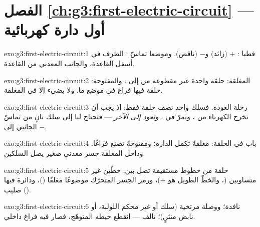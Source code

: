 \section*{الفصل \ref{ch:g3:first-electric-circuit} --- أول دارة كهربائية}

\begin{solution}{exo:g3:first-electric-circuit:1}
قطبا : $+$ (زائد) و$-$ (ناقص). وموضعا تماسّ :
الطرف في أسفل القاعدة، والجانب المعدني من القاعدة.
\end{solution}

\begin{solution}{exo:g3:first-electric-circuit:2}
المغلقة: حلقة واحدة غير مقطوعة من  إلى . والمفتوحة: حلقة
فيها فراغ في موضع ما. ولا يضيء  إلا في المغلقة.
\end{solution}

\begin{solution}{exo:g3:first-electric-circuit:3}
رحلة العودة. فسلك واحد نصف حلقة فقط: إذ يجب أن تخرج الكهرباء من
، وتمرّ في ، \emph{وتعود إلى  الآخر} --- فتحتاج
ليا إلى سلك ثانٍ من تماسّ  الجانبي إلى  $-$.
\end{solution}

\begin{solution}{exo:g3:first-electric-circuit:4}
 باب في الحلقة: مغلقةً تكمل الدارة؛ ومفتوحةً تصنع فراغًا.
وداخل  المغلقة جسر معدني صغير يصل السلكين.
\end{solution}

\begin{solution}{exo:g3:first-electric-circuit:5}
حلقة من خطوط مستقيمة تصل بين: خطّين غير متساويين (،
والخطّ الطويل هو $+$)، ورمز الجسر المتحرّك موضوعًا مغلقًا
()، ودائرة فيها صليب ().
\end{solution}

\begin{solution}{exo:g3:first-electric-circuit:6}
 نافدة؛ ووصلة مرتخية (سلك أو  غير محكم اللولبة، أو
نابض منثنٍ)؛  تالف --- انقطع خيطه المتوهّج، فصار فيه فراغ
داخلي.
\end{solution}

